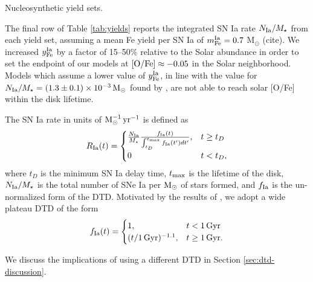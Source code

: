 \documentclass[twocolumn,twocolappendix,linenumbers]{aastex631}
\newcommand{\todo}[1]{{\color{red}#1}}
\begin{document}
\begin{table}
    \centering
    \caption{Nucleosynthetic yield sets.}
    \label{tab:yields}
    
\end{table}

The final row of Table \ref{tab:yields} reports the integrated SN Ia rate $N_{\rm Ia}/M_\star$ from each yield set, assuming a mean Fe yield per SN Ia of $m_{\rm Fe}^{\rm Ia}=0.7$ M$_\odot$ \todo{(cite)}. We increased $y_{\rm Fe}^{\rm Ia}$ by a factor of 15--50\% relative to the Solar abundance in order to set the endpoint of our models at ${\rm [O/Fe]}\approx-0.05$ in the Solar neighborhood. Models which assume a lower value of $y_{\rm Fe}^{\rm Ia}$, in line with the value for $N_{\rm Ia}/M_\star=(1.3\pm0.1)\times10^{-3}\,{\rm M}_\odot$ found by \citet{maoz_star_2017}, are not able to reach solar [O/Fe] within the disk lifetime.

The SN Ia rate in units of ${\rm M}_\odot^{-1}\,{\rm yr}^{-1}$ is defined as
\begin{equation}
    R_{\rm Ia}(t) = 
    \begin{cases}
        \frac{N_{\rm Ia}}{M_\star}
        \frac{f_{\rm Ia}(t)}{\int_{t_D}^{t_{\rm max}} f_{\rm Ia}(t') dt'}, & t \ge t_D \\
        0 & t < t_D,
    \end{cases}
    \label{eq:dtd-function}
\end{equation}
where $t_D$ is the minimum SN Ia delay time, $t_{\rm max}$ is the lifetime of the disk, $N_{\rm Ia}/M_\star$ is the total number of SNe Ia per ${\rm M}_\odot$ of stars formed, and $f_{\rm Ia}$ is the un-normalized form of the DTD. Motivated by the results of \citet{dubay_galactic_2024}, we adopt a wide plateau DTD of the form
\begin{equation}
    \label{eq:plateau-dtd}
    f_{\rm Ia}(t) =
    \begin{cases}
        1, & t < 1\,{\rm Gyr} \\
        (t/1\,{\rm Gyr})^{-1.1}, & t \ge 1\,{\rm Gyr}.
    \end{cases}
\end{equation}

We discuss the implications of using a different DTD in Section \ref{sec:dtd-discussion}.
\end{document}
